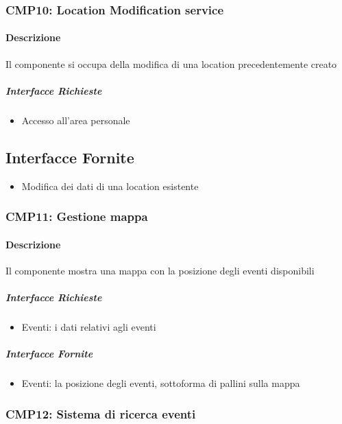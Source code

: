 \documentclass[9pt]{extarticle}
\begin{document}
\subsubsection*{CMP10: Location Modification service}
\paragraph{Descrizione}
Il componente si occupa della modifica di una location precedentemente creato
\subparagraph{Interfacce Richieste}
\begin{itemize}
	\item Accesso all'area personale
\end{itemize}
\subsection{Interfacce Fornite}
\begin{itemize}
	\item Modifica dei dati di una location esistente
\end{itemize}

\subsubsection*{CMP11: Gestione mappa}
\paragraph{Descrizione}
Il componente mostra una mappa con la posizione degli eventi disponibili
\subparagraph{Interfacce Richieste}
\begin{itemize}
	\item Eventi: i dati relativi agli eventi
\end{itemize}
\subparagraph{Interfacce Fornite}
\begin{itemize}
	\item Eventi: la posizione degli eventi, sottoforma di pallini sulla mappa
\end{itemize}

\subsubsection*{CMP12: Sistema di ricerca eventi}
\end{document}
